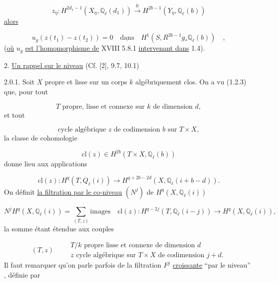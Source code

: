 \begin{equation}\tag{1.7.2}
z_{\overline{\eta}} : H^{2d_1-1} (X_{\overline{\eta}}, \mathbb{Q}_\ell(d_1)) \stackrel{0}{\longrightarrow} H^{2b-1}(Y_{\overline{\eta}}, \mathbb{Q}_\ell(b))
\end{equation}
\underline{alors}

\begin{equation}\tag{1.7.3}
u_g(z(t_1) - z(t_2)) = 0 \quad \underline{\mbox{dans}} \quad H^1(S, R^{2b-1}g_* \mathbb{Q}_\ell(b)) \quad ,
\end{equation}
(\underline{où} $u_g$ \underline{est l'homomorphisme de} XVIII 5.8.1 \underline{intervenant dans} 1.4).




2.  \underline{Un rappel sur le niveau} (Cf. [2], 9.7, 10.1)

2.0.1. Soit  $X$  propre et lisse sur un corps  $k$  algébriquement clos. On a vu (1.2.3) que, pour tout

\begin{equation}\tag{2.0.2}
T \text{ propre, lisse et connexe sur } k \text{ de dimension } d ,
\end{equation}
et tout

\begin{equation}\tag{2.0.3}
\text{cycle algébrique } z \text{ de codimension } b \text{ sur } T \times X,
\end{equation}
la classe de cohomologie

\begin{equation}\tag{2.0.4}
\mathrm{cl}(z) \in H^{2b}(T \times X , \mathbb{Q}_\ell(b))
\end{equation}
donne lieu aux applications

\begin{equation}\tag{2.0.5}
\mathrm{cl}(z) : H^q(T, Q_\ell(i)) \longrightarrow H^{q+2b-2d} (X, \mathbb{Q}_\ell(i+b-d)) .
\end{equation}
On définit \underline{la filtration par le co-niveau}  $(N^j)$  de  $H^q(X,\mathbb{Q}_\ell(i))$

\begin{equation}\tag{2.0.6}
N^j H^q(X,\mathbb{Q}_\ell(i)) = \sum_{(T,z)} \text{images} \quad \mathrm{cl}(z) : H^{q-2j}(T,\mathbb{Q}_\ell(i-j)) \longrightarrow H^q(X,\mathbb{Q}_\ell(i)),
\end{equation}
la somme étant étendue aux couples

\begin{equation}\tag{2.0.7}
(T, z) \qquad \begin{array}{l} T/k \text{ propre lisse et connexe de dimension } d \\ z \text{ cycle algébrique sur } T \times X \text{ de codimension } j+d. \end{array}
\end{equation}
Il faut remarquer qu'on parle parfois de la filtration  $F^j$  \underline{croissante} ``par le niveau''  , définie par

